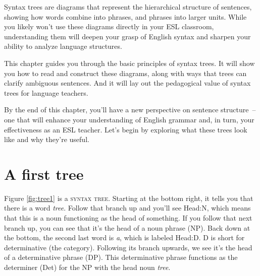 Syntax trees are diagrams that represent the hierarchical structure of sentences, showing how words combine into phrases, and phrases into larger units. While you likely won't use these diagrams directly in your ESL classroom, understanding them will deepen your grasp of English syntax and sharpen your ability to analyze language structures.


This chapter guides you through the basic principles of syntax trees. It will show you how to read and construct these diagrams, along with ways that trees can clarify ambiguous sentences. And it will lay out the pedagogical value of syntax trees for language teachers.

By the end of this chapter, you'll have a new perspective on sentence structure~-- one that will enhance your understanding of English grammar and, in turn, your effectiveness as an ESL teacher. Let's begin by exploring what these trees look like and why they're useful.





\section{A first tree}

Figure \ref{fig:tree1} is a \textsc{syntax tree}. Starting at the bottom right, it tells you that there is a word \textit{tree}. Follow that branch up and you'll see Head:N, which means that this is a noun functioning as the head of something. If you follow that next branch up, you can see that it's the head of a noun phrase (NP). Back down at the bottom, the second last word is \textit{a}, which is labeled Head:D. D is short for determinative (the category). Following its branch upwards, we see it's the head of a determinative phrase (DP). This determinative phrase functions as the determiner (Det) for the NP with the head noun \textit{tree}.

